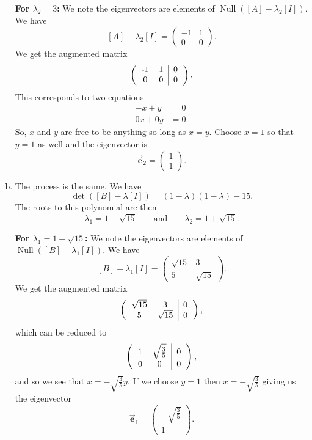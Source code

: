 \documentclass[12pt]{article} %
\newcommand{\Null}{\operatorname{Null}}
\newcommand{\evec}{\vec{\boldsymbol{e}}}
\begin{document}
\begin{solution}
\begin{enumerate}[(a)]
    \noindent\textbf{For $\lambda_2 = 3$:} We note the eigenvectors are elements of $\Null([A]-\lambda_2[I])$.  We have
    \[
    [A]-\lambda_2 [I] = \begin{pmatrix} -1 & 1 \\ 0 & 0 \end{pmatrix}.
    \]
    We get the augmented matrix
    \[
        \left(\begin{tabular}{cc|c} -1 & 1 & 0 \\ 0 & 0 & 0 \end{tabular}\right).
    \]
    This corresponds to two equations
    \begin{align*}
        -x + y &=0\\
        0x + 0y &=0.
    \end{align*}
    So, $x$ and $y$ are free to be anything so long as $x=y$. Choose $x=1$ so that $y=1$ as well and the eigenvector is
    \[
    \evec_2 = \begin{pmatrix} 1 \\ 1 \end{pmatrix}.
    \]

    \item The process is the same.  We have
    \[
    \det([B]-\lambda [I]) = (1-\lambda)(1-\lambda)-15.
    \]
    The roots to this polynomial are then
    \[
    \lambda_1 = 1-\sqrt{15} \qquad \textrm{and} \qquad \lambda_2 = 1+ \sqrt{15}.
    \]

    \noindent\textbf{For $\lambda_1 = 1-\sqrt{15}$:} We note the eigenvectors are elements of $\Null([B]-\lambda_1[I])$.  We have
    \[
    [B]-\lambda_1 [I] = \begin{pmatrix} \sqrt{15} & 3 \\ 5 & \sqrt{15} \end{pmatrix}.
    \]
    We get the augmented matrix
    \[
        \left(\begin{tabular}{cc|c} $\sqrt{15}$ & 3 & 0 \\ 5 & $\sqrt{15}$ & 0 \end{tabular}\right),
    \]
    which can be reduced to
    \[
        \left(\begin{tabular}{cc|c} $1$ & $\sqrt{\frac{3}{5}}$ & 0 \\ 0 & 0 & 0 \end{tabular}\right),
    \]
    and so we see that $x=-\sqrt{\frac{3}{5}}y$. If we choose $y=1$ then $x=-\sqrt{\frac{3}{5}}$ giving us the eigenvector
    \[
    \evec_1 = \begin{pmatrix} -\sqrt{\frac{3}{5}} \\ 1 \end{pmatrix}.
    \]


\end{enumerate}
\end{solution}
\end{document}
